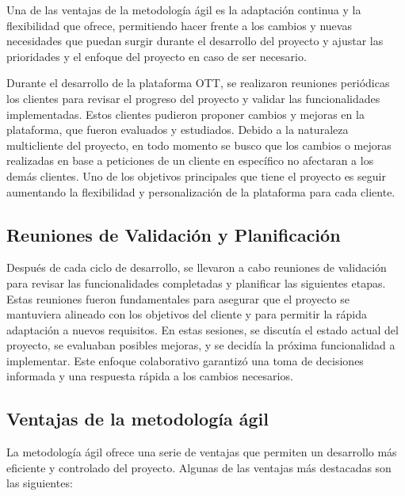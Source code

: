 Una de las ventajas de la metodología ágil es la adaptación continua y la flexibilidad que ofrece, permitiendo
hacer frente a los cambios y nuevas necesidades que puedan surgir durante el desarrollo del proyecto y ajustar
las prioridades y el enfoque del proyecto en caso de ser necesario.

Durante el desarrollo de la plataforma OTT, se realizaron reuniones periódicas los clientes para revisar
el progreso del proyecto y validar las funcionalidades implementadas. Estos clientes
pudieron proponer cambios y mejoras en la plataforma, que fueron evaluados y estudiados. Debido a la naturaleza
multicliente del proyecto, en todo momento se busco que los cambios o mejoras realizadas en base a peticiones de un 
cliente en específico no afectaran a los demás clientes. Uno de los objetivos principales que tiene el proyecto
es seguir aumentando la flexibilidad y personalización de la plataforma para cada cliente.


\subsection{Reuniones de Validación y Planificación}
\label{subsec:reuniones_validacion}

Después de cada ciclo de desarrollo, se llevaron a cabo reuniones de validación para revisar las 
funcionalidades completadas y planificar las siguientes etapas. Estas reuniones fueron fundamentales 
para asegurar que el proyecto se mantuviera alineado con los objetivos del cliente y para permitir la 
rápida adaptación a nuevos requisitos. En estas sesiones, se discutía el estado actual del proyecto, 
se evaluaban posibles mejoras, y se decidía la próxima funcionalidad a implementar. Este enfoque 
colaborativo garantizó una toma de decisiones informada y una respuesta rápida a los cambios necesarios.


\subsection{Ventajas de la metodología ágil}
\label{subsec:ventajas_agil}

La metodología ágil ofrece una serie de ventajas que permiten un desarrollo más eficiente y controlado del proyecto.
Algunas de las ventajas más destacadas son las siguientes:

